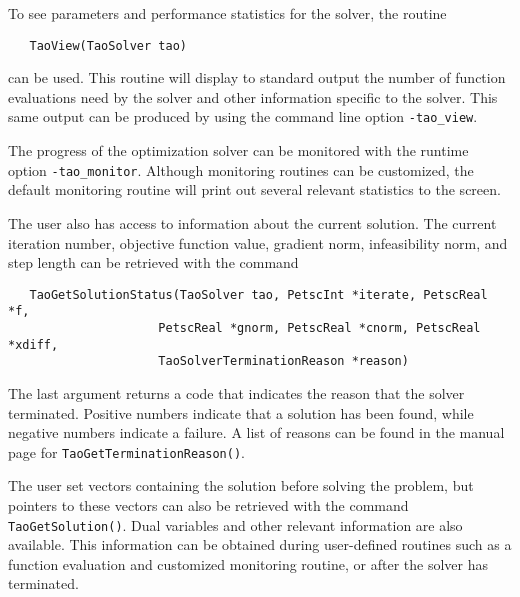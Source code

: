 To see parameters and performance statistics for the solver, the
routine
\begin{verbatim}
   TaoView(TaoSolver tao)
\end{verbatim}
can be used.  This routine will display to standard output the number
of function evaluations need by the solver and other information
specific to the solver.  This same output can be produced by using the 
command line option {\tt -tao\_view}.

The progress of the optimization solver can be monitored with
the runtime option {\tt -tao\_monitor}.  Although monitoring routines
can be customized, the default monitoring routine will print out 
several relevant statistics to the screen.

The user also has access to information about the current solution.
The current iteration number, objective function value, gradient
norm, infeasibility norm, and step length 
can be retrieved with the command 
\begin{verbatim}
   TaoGetSolutionStatus(TaoSolver tao, PetscInt *iterate, PetscReal *f,
                     PetscReal *gnorm, PetscReal *cnorm, PetscReal *xdiff,
                     TaoSolverTerminationReason *reason)
\end{verbatim}
\noindent
The last argument returns a code that indicates the reason that the solver 
terminated.  Positive 
numbers indicate that a solution has been found, while negative numbers
indicate a failure.  A list of reasons can be found in the manual page
for {\tt Tao\-Get\-Termination\-Reason()}.

The user set
vectors containing the solution before solving
the problem, but pointers to these vectors can also be retrieved with the
command {\tt TaoGetSolution()}.
Dual variables and other relevant information are also available. 
This information can be obtained during
user-defined routines such as a function evaluation and customized
monitoring routine, or after the solver has terminated.

